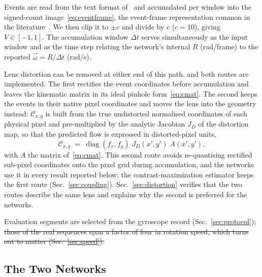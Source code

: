 \documentclass[journal]{IEEEtran}
\newcommand{\Vmap}{V}
\newcommand{\Cmat}{\mathcal{C}}
\newcommand{\wvec}{\vec{\omega}}
\begin{document}
Events are read from the text format of~\cite{mueggler2017} and accumulated per
window into the signed-count image~\eqref{eq:eventframe}, the event-frame
representation common in the literature~\cite{gallego2022survey}. We then clip it 
to $\pm c$ and divide by $c$ ($c = 10$), giving $\Vmap \in [-1,1]$. The accumulation window
$\Delta t$ serves simultaneously as the input window and as the time step
relating the network's internal $R$ (rad/frame) to the reported
$\wvec = R/\Delta t$ (rad/s).

Lens distortion can be removed at either end of this path, and both routes are
implemented. The first rectifies the event coordinates before accumulation and
leaves the kinematic matrix in its ideal pinhole form~\eqref{eq:cmat}. The second
keeps the events in their native pixel coordinates and moves the lens into the
geometry instead: $\Cmat_{x,y}$ is built from the true undistorted normalised
coordinates of each physical pixel and pre-multiplied by the analytic Jacobian
$J_D$ of the distortion map, so that the predicted flow is expressed in
distorted-pixel units,
\begin{equation}
\Cmat_{x,y} \;=\; \operatorname{diag}(f_x,f_y)\; J_D(x',y')\; A(x',y'),
\label{eq:cdist}
\end{equation}
with $A$ the matrix of~\eqref{eq:cmat}. This second route avoids re-quantising
rectified sub-pixel coordinates onto the pixel grid during accumulation, and the
networks use it in every result reported below; the contrast-maximization
estimator keeps the first route (Sec.~\ref{sec:coupling}).
Sec.~\ref{sec:distortion} verifies that the two routes describe the same lens
and explains why the second is preferred for the networks.

Evaluation segments are selected from the gyroscope record
(Sec.~\ref{sec:protocol}); \st{those of the real sequences span a factor of four in rotation speed, which turns out to matter (Sec.~\protect\ref{sec:speed}).}

\subsection{The Two Networks}
\label{sec:networks}
\end{document}
